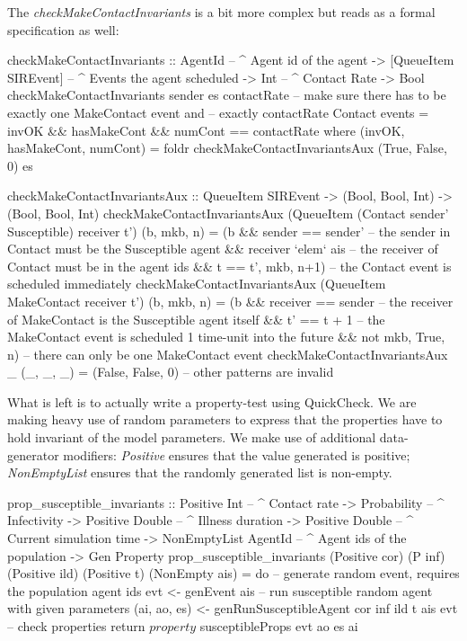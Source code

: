 The \textit{checkMakeContactInvariants} is a bit more complex but reads as a formal specification as well:

\begin{HaskellCode}
checkMakeContactInvariants :: AgentId              -- ^ Agent id of the agent 
                           -> [QueueItem SIREvent] -- ^ Events the agent scheduled
                           -> Int                  -- ^ Contact Rate
                           -> Bool
checkMakeContactInvariants sender es contactRate
    -- make sure there has to be exactly one MakeContact event and
    -- exactly contactRate Contact events
    = invOK && hasMakeCont && numCont == contactRate
  where
    (invOK, hasMakeCont, numCont) 
      = foldr checkMakeContactInvariantsAux (True, False, 0) es

    checkMakeContactInvariantsAux :: QueueItem SIREvent 
                                  -> (Bool, Bool, Int)
                                  -> (Bool, Bool, Int)
    checkMakeContactInvariantsAux 
        (QueueItem (Contact sender' Susceptible) receiver t') (b, mkb, n)
      = (b && sender == sender'    -- the sender in Contact must be the Susceptible agent
           && receiver `elem` ais  -- the receiver of Contact must be in the agent ids
           && t == t', mkb, n+1)   -- the Contact event is scheduled immediately
    checkMakeContactInvariantsAux 
        (QueueItem MakeContact receiver t') (b, mkb, n) 
      = (b && receiver == sender   -- the receiver of MakeContact is the Susceptible agent itself
           && t' == t + 1          -- the MakeContact event is scheduled 1 time-unit into the future
           &&  not mkb, True, n)   -- there can only be one MakeContact event
    checkMakeContactInvariantsAux _ (_, _, _) 
      = (False, False, 0)          -- other patterns are invalid
\end{HaskellCode}

What is left is to actually write a property-test using QuickCheck. We are making heavy use of random parameters to express that the properties have to hold invariant of the model parameters. We make use of additional data-generator modifiers: \textit{Positive} ensures that the value generated is positive; \textit{NonEmptyList} ensures that the randomly generated list is non-empty.

\begin{HaskellCode}
prop_susceptible_invariants :: Positive Int         -- ^ Contact rate
                            -> Probability          -- ^ Infectivity
                            -> Positive Double      -- ^ Illness duration
                            -> Positive Double      -- ^ Current simulation time
                            -> NonEmptyList AgentId -- ^ Agent ids of the population
                            -> Gen Property
prop_susceptible_invariants 
  (Positive cor) (P inf) (Positive ild) (Positive t) (NonEmpty ais) = do
  -- generate random event, requires the population agent ids
  evt <- genEvent ais
  -- run susceptible random agent with given parameters
  (ai, ao, es) <- genRunSusceptibleAgent cor inf ild t ais evt
  -- check properties
  return $ property $ susceptibleProps evt ao es ai
\end{HaskellCode}

